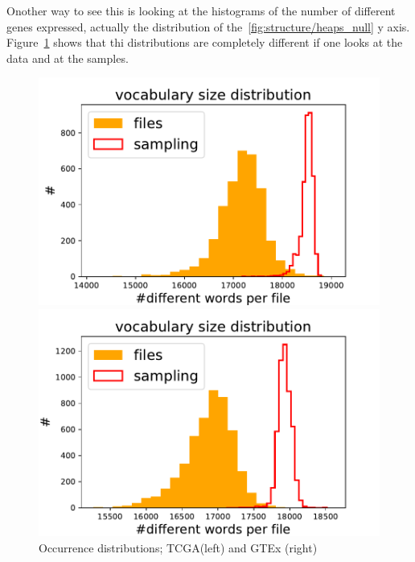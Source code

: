 Onother way to see this is looking at the histograms of the number of different genes expressed, actually the distribution of the~\ref{fig:structure/heaps_null} y axis. Figure~\ref{fig:structure/diffwordsDistr_null} shows that thi distributions are completely different if one looks at the data and at the samples.
\begin{figure}[htb!]
\begin{minipage}{0.5\textwidth}
    \centering
    \includegraphics[width=0.95\linewidth]{pictures/structure/tcga/diffwordsDistr_null.pdf}
    \end{minipage}
\hspace{2mm}
\begin{minipage}{0.5\textwidth}
    \centering
    \includegraphics[width=0.95\linewidth]{pictures/structure/gtex/diffwordsDistr_null.pdf}
    \end{minipage}
\caption{Occurrence distributions; TCGA(left) and GTEx (right)}
\label{fig:structure/diffwordsDistr_null}
\end{figure}